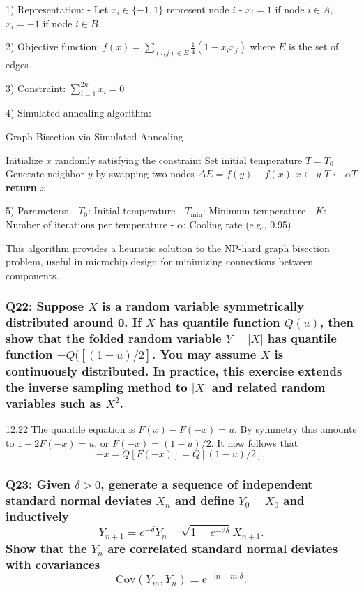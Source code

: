 \documentclass[8pt]{article}
\begin{document}
1) Representation:
   - Let $x_i \in \{-1,1\}$ represent node $i$
   - $x_i = 1$ if node $i \in A$, $x_i = -1$ if node $i \in B$

2) Objective function:
   $f(x) = \sum_{(i,j) \in E} \frac{1}{4}(1 - x_ix_j)$
   where $E$ is the set of edges

3) Constraint:
   $\sum_{i=1}^{2n} x_i = 0$

4) Simulated annealing algorithm:

   \begin{algorithm}
   \caption{Graph Bisection via Simulated Annealing}
   \begin{algorithmic}
   \State Initialize $x$ randomly satisfying the constraint
   \State Set initial temperature $T = T_0$
       \State Generate neighbor $y$ by swapping two nodes
       \State $\Delta E = f(y) - f(x)$
         \State $x \gets y$
       \EndIf
     \EndFor
     \State $T \gets \alpha T$ 
   \EndWhile
   \State \textbf{return} $x$
   \end{algorithmic}
   \end{algorithm}

5) Parameters:
   - $T_0$: Initial temperature
   - $T_{\text{min}}$: Minimum temperature
   - $K$: Number of iterations per temperature
   - $\alpha$: Cooling rate (e.g., 0.95)

This algorithm provides a heuristic solution to the NP-hard graph bisection problem, useful in microchip design for minimizing connections between components.

\subsubsection*{Q22: Suppose \(X\) is a random variable symmetrically distributed around 0. If \(X\) has quantile function \(Q(u)\), then show that the folded random variable \(Y = |X|\) has quantile function \(-Q([(1-u)/2]\). You may assume \(X\) is continuously distributed. In practice, this exercise extends the inverse sampling method to \(|X|\) and related random variables such as \(X^2\).}

12.22 The quantile equation is \( F(x) - F(-x) = u \). By symmetry this amounts to \( 1 - 2F(-x) = u \), or \( F(-x) = (1 - u)/2 \). It now follows that
\[
-x = Q[F(-x)] = Q[(1 - u)/2],
\]

\subsubsection*{Q23: Given \(\delta > 0\), generate a sequence of independent standard normal deviates \(X_n\) and define \(Y_0 = X_0\) and inductively
\[
Y_{n+1} = e^{-\delta} Y_n + \sqrt{1 - e^{-2\delta}} X_{n+1}.
\]
Show that the \(Y_n\) are correlated standard normal deviates with covariances
\[
\text{Cov}(Y_m, Y_n) = e^{-|n-m|\delta}.
\]}
\end{document}
